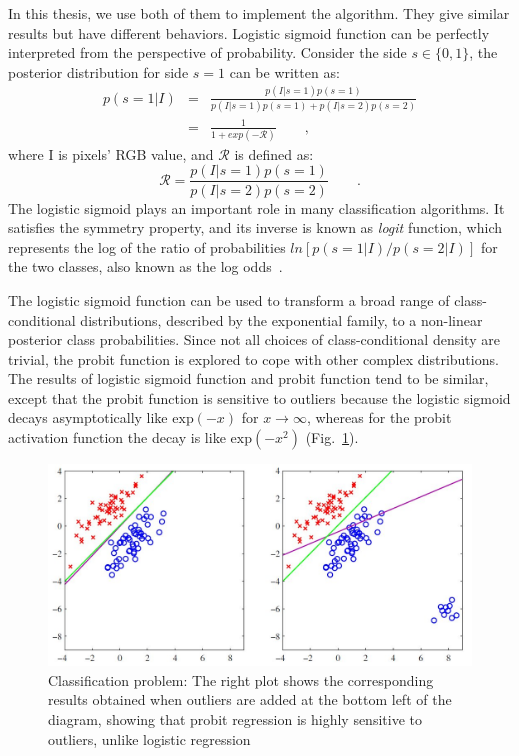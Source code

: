 \documentclass[conference]{IEEEtran}
\begin{document}
In this thesis, we use both of them to implement the algorithm. They give
similar results but have different behaviors. Logistic sigmoid function
can be perfectly interpreted from the perspective of
probability. Consider the side $s \in \{0,1\}$, the posterior
distribution for side $s = 1$ can be written as:
\begin{eqnarray}
  \label{eq:pdfs}
  p(s=1|I) &=& \frac{p(I|s=1)p(s=1)}{p(I|s=1)p(s=1)
    + p(I|s=2)p(s=2)}\\
&=&  \frac{1}{1+exp(-\mathcal{R})}\qquad,
\end{eqnarray}
where I is pixels' RGB value, and $\mathcal{R}$ is defined as:
\begin{equation}
  \label{eq:ratio}
  \mathcal{R} = \frac{p(I|s=1)p(s=1)}{p(I|s=2)p(s=2)}\qquad.
\end{equation}
The logistic sigmoid plays an important role in many classification
algorithms. It satisfies the symmetry property, and its inverse 
is known as \textit{logit} function, which represents the log of the
ratio of probabilities $ln [p(s=1|I)/p(s=2|I)]$ for the two classes,
also known as the log odds~\cite{bishop2006pattern}.

The logistic sigmoid function can be used to transform a broad range
of class-conditional distributions, described by the exponential
family, to a non-linear posterior class probabilities. Since not all choices of
class-conditional density are trivial, the probit function is explored
to cope with other complex distributions. The results of logistic
sigmoid function and probit function tend to be similar, except that the
probit function is sensitive to outliers because the logistic sigmoid
decays asymptotically like $\mathrm{exp}(-x)$ for $x \rightarrow \infty$, whereas
for the probit activation function the decay is like
$\mathrm{exp}(-x^2)$ (Fig.~\ref{fig:outliers}).
\begin{figure} 
  \includegraphics[width=\columnwidth]{images/outliers.jpg}
\caption{Classification problem: The
  right plot shows the corresponding results obtained when outliers
  are added at the bottom left of the diagram, showing  that probit
  regression is highly sensitive to outliers, unlike logistic
  regression~\cite{bishop2006pattern}}
\label{fig:outliers}
\end{figure}
\end{document}
